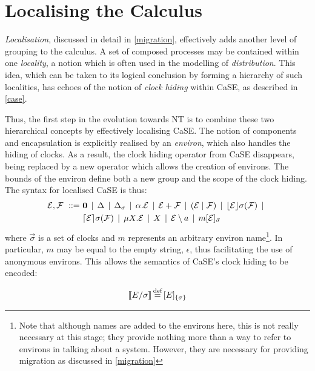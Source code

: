 \section{Localising the Calculus}
\label{localising}

\emph{Localisation}, discussed in detail in \ref{migration}, effectively
adds another level of grouping to the calculus.  A set of composed
processes may be contained within one \emph{locality}, a notion which is
often used in the modelling of \emph{distribution}.  This idea, which
can be taken to its logical conclusion by forming a hierarchy of such
localities, has echoes of the notion of \emph{clock hiding} within CaSE,
as described in \ref{case}.

Thus, the first step in the evolution towards NT is to combine these
two hierarchical concepts by effectively localising CaSE.  The notion of
components and encapsulation is explicitly realised by an
\emph{environ}, which also handles the hiding of clocks.  As a result,
the clock hiding operator from CaSE disappears, being replaced by a new
operator which allows the creation of environs.  The bounds of the
environ define both a new group and the scope of the clock hiding.  The
syntax for localised CaSE is thus:
\begin{equation}
  \begin{aligned}
    \text{$\mathcal{E}$}, \text{$\mathcal{F}$}\ ::=\ &
    \textbf{0}  \;\,|\,\; 
    \Delta \;\,|\,\; 
    \Delta_{\sigma} \;\,|\,\; 
    \alpha . \text{$\mathcal{E}$}  \;\,|\,\;
    \text{$\mathcal{E}$} + \text{$\mathcal{F}$} \;\,|\,\; 
    (\text{$\mathcal{E}$}\;|\;\text{$\mathcal{F}$})\;\,|\,\; 
    \lfloor{\text{$\mathcal{E}$}}\rfloor {\sigma} ({\text{$\mathcal{F}$}}) \;\,|\,\; \\
    & \lceil{\text{$\mathcal{E}$}}\rceil {\sigma} ({\text{$\mathcal{F}$}}) \;\,|\,\; 
    \mu X . \text{$\mathcal{E}$} \;\,|\,\; 
    X \;\,|\,\; 
    \text{$\mathcal{E}$} \setminus a \;\,|\,\; 
    {m}[ \text{$\mathcal{E}$} ]_{\vec{\sigma}}
  \end{aligned}
\end{equation}
where $\vec{\sigma}$ is a set of clocks and $m$ represents an
arbitrary environ name\footnote{Note that although names are added to
  the environs here, this is not really necessary at this stage; they
  provide nothing more than a way to refer to environs in talking
  about a system.  However, they are necessary for providing migration
  as discussed in \ref{migration}}.  In particular, $m$ may be equal
to the empty string, $\epsilon$, thus facilitating the use of
anonymous environs.  This allows the semantics of CaSE's clock hiding
to be encoded:

\begin{equation}
[\hspace{-0.3ex}[ E / \sigma ]\hspace{-0.3ex}] \operatorname{\stackrel{\textrm{def}}{=}} {}[ E ]_{\{\sigma\}}
\end{equation}

